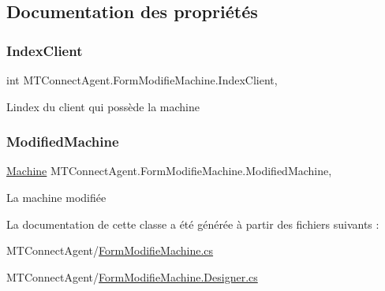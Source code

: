 \subsection{Documentation des propriétés}
\mbox{\label{class_m_t_connect_agent_1_1_form_modifie_machine_a3f000e4c915524cf56e0ef077c1a9c96}} 
\subsubsection{\texorpdfstring{Index\+Client}{IndexClient}}
{\footnotesize\ttfamily int M\+T\+Connect\+Agent.\+Form\+Modifie\+Machine.\+Index\+Client\hspace{0.3cm}{\ttfamily [get]}, {\ttfamily [set]}}



L\textquotesingle{}index du client qui possède la machine 

\mbox{\label{class_m_t_connect_agent_1_1_form_modifie_machine_ad14ae74d3b5cd3987f6a9604514eb3c1}} 
\subsubsection{\texorpdfstring{Modified\+Machine}{ModifiedMachine}}
{\footnotesize\ttfamily \mbox{\hyperlink{class_m_t_connect_agent_1_1_model_1_1_machine}{Machine}} M\+T\+Connect\+Agent.\+Form\+Modifie\+Machine.\+Modified\+Machine\hspace{0.3cm}{\ttfamily [get]}, {\ttfamily [set]}}



La machine modifiée 



La documentation de cette classe a été générée à partir des fichiers suivants \+:\begin{DoxyCompactItemize}
\item 
M\+T\+Connect\+Agent/\mbox{\hyperlink{_form_modifie_machine_8cs}{Form\+Modifie\+Machine.\+cs}}\item 
M\+T\+Connect\+Agent/\mbox{\hyperlink{_form_modifie_machine_8_designer_8cs}{Form\+Modifie\+Machine.\+Designer.\+cs}}\end{DoxyCompactItemize}
